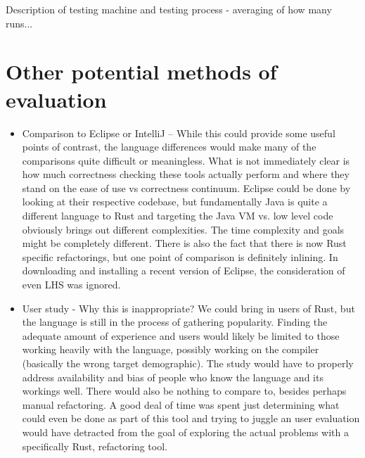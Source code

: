Description of testing machine and testing process - averaging of how many runs... 


\section{Other potential methods of evaluation}

\begin{itemize}

\item Comparison to Eclipse or IntelliJ -- While this could provide some useful points of contrast, the language differences would make many of the comparisons quite difficult or meaningless. What is not immediately clear is how much correctness checking these tools actually perform and where they stand on the ease of use vs correctness continuum. Eclipse could be done by looking at their respective codebase, but fundamentally Java is quite a different language to Rust and targeting the Java VM vs. low level code obviously brings out different complexities. The time complexity and goals might be completely different. There is also the fact that there is now Rust specific refactorings, but one point of comparison is definitely inlining. In downloading and installing a recent version of Eclipse, the consideration of even LHS was ignored.


\item User study - Why this is inappropriate? We could bring in users of Rust, but the language is still in the process of gathering popularity. Finding the adequate amount of experience and users would likely be limited to those working heavily with the language, possibly working on the compiler (basically the wrong target demographic). The study would have to properly address availability and bias of people who know the language and its workings well. There would also be nothing to compare to, besides perhaps manual refactoring. A good deal of time was spent just determining what could even be done as part of this tool and trying to juggle an user evaluation would have detracted from the goal of exploring the actual problems with a specifically Rust, refactoring tool. 

\end{itemize}
